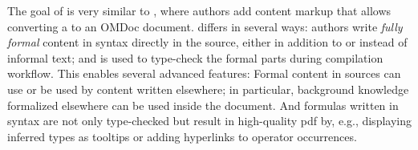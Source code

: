 The goal of \mmttex is very similar to \sTeX \cite{stex}, where authors add content markup that allows converting a \latex to an OMDoc document.
\mmttex differs in several ways: authors write \emph{fully formal} content in \mmt syntax \cite{RK:mmt:10} directly in the \latex source, either in addition to or instead of informal text; and \mmt is used to type-check the formal parts during \latex compilation workflow.
This enables several advanced features:
Formal content in \latex sources can use or be used by \mmt content written elsewhere; in particular, background knowledge formalized elsewhere can be used inside the \latex document.
And formulas written in \mmt syntax are not only type-checked but result in high-quality pdf by, e.g., displaying inferred types as tooltips or adding hyperlinks to operator occurrences.


